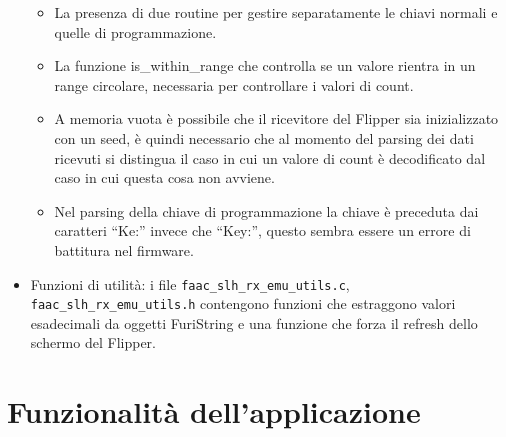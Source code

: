 \begin{itemize}
  \begin{itemize}
    \item La presenza di due routine per gestire separatamente le chiavi normali e quelle di programmazione.
    \item La funzione is\_within\_range che controlla se un valore rientra in un range circolare, necessaria per controllare i valori di count.
    \item A memoria vuota è possibile che il ricevitore del Flipper sia inizializzato con un seed, è quindi necessario che al momento del parsing dei dati ricevuti si distingua il caso in cui un valore di count è decodificato dal caso in cui questa cosa non avviene.
    \item Nel parsing della chiave di programmazione la chiave è preceduta dai caratteri “Ke:” invece che “Key:”, questo sembra essere un errore di battitura nel firmware.
  \end{itemize}
  \item Funzioni di utilità: i file \texttt{faac\_slh\_rx\_emu\_utils.c}, \texttt{faac\_slh\_rx\_emu\_utils.h} contengono funzioni che estraggono valori esadecimali da oggetti FuriString e una funzione che forza il refresh dello schermo del Flipper.
\end{itemize}

\section{Funzionalità dell'applicazione}
\label{sec:func}

